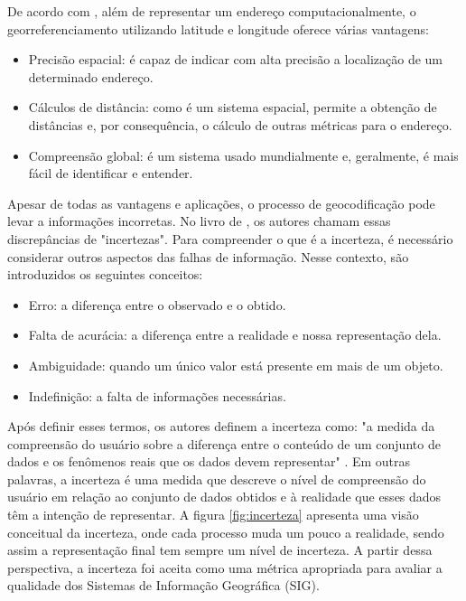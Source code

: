 De acordo com \cite{longley2013}, além de representar um endereço computacionalmente, o georreferenciamento utilizando latitude e longitude oferece várias vantagens:

\begin{itemize}
   \item Precisão espacial: é capaz de indicar com alta precisão a localização de um determinado endereço.
   \item Cálculos de distância: como é um sistema espacial, permite a obtenção de distâncias e, por consequência, o cálculo de outras métricas para o endereço.
   \item Compreensão global: é um sistema usado mundialmente e, geralmente, é mais fácil de identificar e entender.
\end{itemize}

Apesar de todas as vantagens e aplicações, o processo de geocodificação pode levar a informações incorretas. No livro de \cite{longley2013}, os autores chamam essas discrepâncias de "incertezas". Para compreender o que é a incerteza, é necessário considerar outros aspectos das falhas de informação. Nesse contexto, são introduzidos os seguintes conceitos:

\begin{itemize}
   \item Erro: a diferença entre o observado e o obtido.
   \item Falta de acurácia: a diferença entre a realidade e nossa representação dela.
   \item Ambiguidade: quando um único valor está presente em mais de um objeto.
   \item Indefinição: a falta de informações necessárias.
\end{itemize}

Após definir esses termos, os autores definem a incerteza como: "a medida da compreensão do usuário sobre a diferença entre o conteúdo de um conjunto de dados e os fenômenos reais que os dados devem representar" \cite{longley2013}. Em outras palavras, a incerteza é uma medida que descreve o nível de compreensão do usuário em relação ao conjunto de dados obtidos e à realidade que esses dados têm a intenção de representar. A figura \ref{fig:incerteza} apresenta uma visão conceitual da incerteza, onde cada processo muda um pouco a realidade, sendo assim a representação final tem sempre um nível de incerteza. A partir dessa perspectiva, a incerteza foi aceita como uma métrica apropriada para avaliar a qualidade dos Sistemas de Informação Geográfica (SIG).


